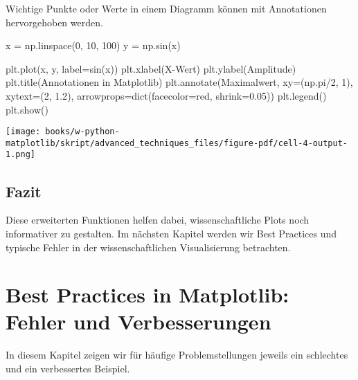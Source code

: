 \documentclass[
  letterpaper,
  DIV=11,
  numbers=noendperiod]{scrreprt}
\newenvironment{Shaded}{\begin{snugshade}}{\end{snugshade}}
\newcommand{\BuiltInTok}[1]{\textcolor[rgb]{0.00,0.23,0.31}{#1}}
\newcommand{\DecValTok}[1]{\textcolor[rgb]{0.68,0.00,0.00}{#1}}
\newcommand{\FloatTok}[1]{\textcolor[rgb]{0.68,0.00,0.00}{#1}}
\newcommand{\NormalTok}[1]{\textcolor[rgb]{0.00,0.23,0.31}{#1}}
\newcommand{\OperatorTok}[1]{\textcolor[rgb]{0.37,0.37,0.37}{#1}}
\newcommand{\StringTok}[1]{\textcolor[rgb]{0.13,0.47,0.30}{#1}}
\begin{document}
\begin{tcolorbox}
Wichtige Punkte oder Werte in einem Diagramm können mit Annotationen
hervorgehoben werden.

\begin{Shaded}
\begin{Highlighting}[]
\NormalTok{x }\OperatorTok{=}\NormalTok{ np.linspace(}\DecValTok{0}\NormalTok{, }\DecValTok{10}\NormalTok{, }\DecValTok{100}\NormalTok{)}
\NormalTok{y }\OperatorTok{=}\NormalTok{ np.sin(x)}

\NormalTok{plt.plot(x, y, label}\OperatorTok{=}\StringTok{\textquotesingle{}sin(x)\textquotesingle{}}\NormalTok{)}
\NormalTok{plt.xlabel(}\StringTok{\textquotesingle{}X{-}Wert\textquotesingle{}}\NormalTok{)}
\NormalTok{plt.ylabel(}\StringTok{\textquotesingle{}Amplitude\textquotesingle{}}\NormalTok{)}
\NormalTok{plt.title(}\StringTok{\textquotesingle{}Annotationen in Matplotlib\textquotesingle{}}\NormalTok{)}
\NormalTok{plt.annotate(}\StringTok{\textquotesingle{}Maximalwert\textquotesingle{}}\NormalTok{, xy}\OperatorTok{=}\NormalTok{(np.pi}\OperatorTok{/}\DecValTok{2}\NormalTok{, }\DecValTok{1}\NormalTok{), xytext}\OperatorTok{=}\NormalTok{(}\DecValTok{2}\NormalTok{, }\FloatTok{1.2}\NormalTok{),}
\NormalTok{             arrowprops}\OperatorTok{=}\BuiltInTok{dict}\NormalTok{(facecolor}\OperatorTok{=}\StringTok{\textquotesingle{}red\textquotesingle{}}\NormalTok{, shrink}\OperatorTok{=}\FloatTok{0.05}\NormalTok{))}
\NormalTok{plt.legend()}
\NormalTok{plt.show()}
\end{Highlighting}
\end{Shaded}

\texttt{[image: books/w-python-matplotlib/skript/advanced\_techniques\_files/figure-pdf/cell-4-output-1.png]}

\section{Fazit}\label{fazit-2}

Diese erweiterten Funktionen helfen dabei, wissenschaftliche Plots noch
informativer zu gestalten. Im nächsten Kapitel werden wir Best Practices
und typische Fehler in der wissenschaftlichen Visualisierung betrachten.

\chapter{Best Practices in Matplotlib: Fehler und
Verbesserungen}\label{best-practices-in-matplotlib-fehler-und-verbesserungen}

In diesem Kapitel zeigen wir für häufige Problemstellungen jeweils ein
schlechtes und ein verbessertes Beispiel.


\end{tcolorbox}
\end{document}
